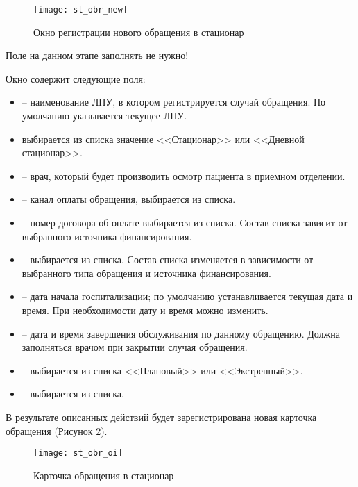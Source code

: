 \begin{figure}[ht]\centering
   \texttt{[image: st\_obr\_new]}
   \caption{Окно регистрации нового обращения в стационар}
   \label{img_st_obr_new}
 \end{figure}

\begin{vnim}
 Поле  на данном этапе заполнять не нужно!
\end{vnim}
 
Окно  содержит следующие поля:
\begin{itemize}
 \item {} – наименование ЛПУ, в котором регистрируется случай обращения. По умолчанию указывается текущее ЛПУ.
 \item {} выбирается из списка значение <<Стационар>> или <<Дневной стационар>>.
 \item {} – врач, который будет производить осмотр пациента в приемном отделении.
 \item {} – канал оплаты обращения, выбирается из списка.
 \item {} – номер договора об оплате выбирается из списка. Состав списка зависит от выбранного источника финансирования.
 \item {} – выбирается из списка. Состав списка изменяется в зависимости от выбранного типа обращения и источника финансирования.
 \item {} – дата начала госпитализации;  по умолчанию устанавливается текущая дата и время. При необходимости дату и время можно изменить.
 \item {} – дата и время завершения обслуживания по данному обращению. Должна заполняться врачом при закрытии случая обращения.
 \item {} – выбирается из списка <<Плановый>> или <<Экстренный>>.
 \item {} – выбирается из списка.
\end{itemize}

В результате описанных действий будет зарегистрирована новая карточка обращения (Рисунок \ref{img_st_obr_oi}).

\begin{figure}[!t]\centering
   \texttt{[image: st\_obr\_oi]}
   \caption{Карточка обращения в стационар}
   \label{img_st_obr_oi}
 \end{figure}

